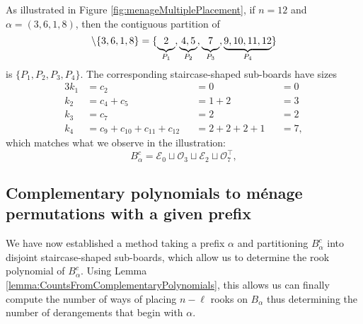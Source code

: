 \begin{example}
  As illustrated in Figure \ref{fig:menageMultiplePlacement}, if $n = 12$
  and $\alpha = (3,6,1,8)$, then the contiguous partition of \begin{equation}
    [12] \setminus \{3,6,1,8\} = \{
      \underbrace{2\vphantom{,}}_{P_1},
      \underbrace{4, 5}_{P_2},
      \underbrace{7\vphantom{,}}_{P_3},
      \underbrace{9, 10, 11, 12}_{P_4}
    \}
  \end{equation} is $\{P_1, P_2, P_3, P_4\}$. The corresponding staircase-shaped sub-boards
  have sizes
  \begin{alignat*}{3}
    k_1 &= c_2                            &&= 0             &&= 0 \\
    k_2 &= c_4 + c_5                      &&= 1 + 2         &&= 3 \\
    k_3 &= c_7                            &&= 2             &&= 2 \\
    k_4 &= c_9 + c_{10} + c_{11} + c_{12} &&= 2 + 2 + 2 + 1 &&= 7,
  \end{alignat*}
  which matches what we observe in the illustration:
  \begin{equation}
    B_\alpha^c = \mathcal{E}_0 \sqcup \mathcal{O}_3 \sqcup \mathcal{E}_2 \sqcup \mathcal{O}_7^\intercal,
  \end{equation}
  \label{ex:blocksFromPrefix}
\end{example}

\subsection{Complementary polynomials to m\'enage permutations with a given prefix}
We have now established a method taking a prefix $\alpha$
and partitioning $B_\alpha^c$ into disjoint staircase-shaped sub-boards,
which allow us to determine the rook polynomial of $B_\alpha^c$.
Using Lemma \ref{lemma:CountsFromComplementaryPolynomials}, this allows us
can finally compute the number of ways of placing $n - \ell$ rooks on
$B_\alpha$ thus determining the number of derangements that begin with
$\alpha$.

